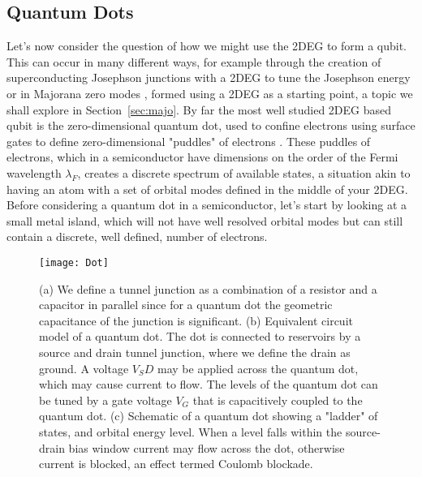 \subsection{Quantum Dots}
\label{sec:qd}
Let's now consider the question of how we might use the 2DEG to form a qubit. This can occur in many different
ways, for example through the creation of superconducting Josephson junctions with a 2DEG to tune the Josephson
energy \cite{karl-gatemon} or in Majorana zero modes \cite{PhysRevLett.119.136803}, formed using a 2DEG as a starting
point, a topic we shall explore in Section~\ref{sec:majo}. By far the most well studied 2DEG based qubit is the zero-dimensional
quantum dot, used to confine electrons using surface gates to define zero-dimensional "puddles" of electrons
\cite{RevModPhys.79.1217,RevModPhys.75.1}.
These puddles of electrons, which in a semiconductor have dimensions on the order of the Fermi wavelength $\lambda_F$,
creates a discrete spectrum of available states, a situation akin to having an atom with a set of orbital modes
defined in the middle of your 2DEG\cite{PhysRevLett.77.3613}. Before considering a quantum dot in a semiconductor, let's
start by looking at a small metal island, which will not have well resolved orbital modes but can still contain a discrete,
well defined, number of electrons.

\begin{figure}
  \texttt{[image: Dot]}
  \caption[Schematic of a single quantum dot]
  {\label{fig:QD}(a) We define a tunnel junction as a combination of a resistor and a capacitor in parallel
  since for a quantum dot the geometric capacitance of the junction is significant. (b) Equivalent circuit
  model of a quantum dot. The dot is connected to reservoirs by a source and drain tunnel junction, where
  we define the drain as ground. A voltage $V_SD$ may be applied across the quantum dot, which may cause current
  to flow. The levels of the quantum dot can be tuned by a gate voltage $V_G$ that is capacitively coupled to the
  quantum dot. (c) Schematic of a quantum dot showing a "ladder" of states, and orbital energy level. When a level
  falls within the source-drain bias window current may flow across the dot, otherwise current is blocked, an
  effect termed Coulomb blockade.}
\end{figure}

